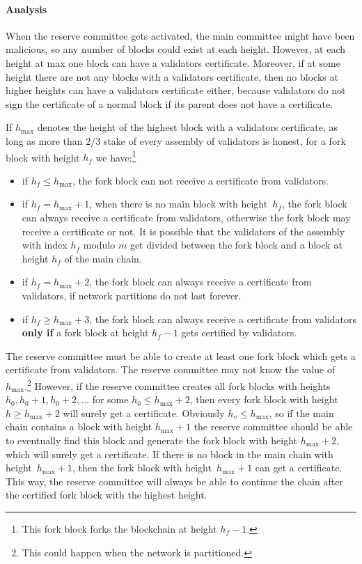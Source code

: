 \paragraph{Analysis}

When the reserve committee gets activated, the main committee might have been malicious, so any number of blocks could
exist at each height. However, at each height at max one block can have a validators certificate. Moreover, if at some
height there are not any blocks with a validators certificate, then no blocks at higher heights can have a
validators certificate either, because validators do not sign the certificate of a normal block if its parent does
not have a certificate.

If $h_{\max}$ denotes the height of the highest block with a validators certificate, as long as more than $2/3$ stake
of every assembly of validators is honest, for a fork block with height $h_f$ we have:\footnote{This fork block
forks the blockchain at height $h_f-1$.}
\begin{itemize}
    \item if $h_f \leq h_{\max}$, the fork block can not receive a certificate from validators.
    \item if $h_f = h_{\max} + 1$, when there is no main block with height~$h_f$, the fork block can always receive a
    certificate from validators, otherwise the fork block may receive a certificate or not. It is possible that
    the validators of the assembly with index $h_f$ modulo $m$ get divided between the fork block and a block at
    height $h_f$ of the main chain.
    \item if $h_f = h_{\max} + 2$, the fork block can always receive a certificate from validators, if network
    partitions do not last forever.
    \item if $h_f \geq h_{\max} + 3$, the fork block can always receive a certificate from validators \textbf{only if} a
    fork block at height $h_f-1$ gets certified by validators.
\end{itemize}

The reserve committee must be able to create at least one fork block which gets a certificate from validators.
The reserve committee may not know the value of $h_{\max}$.\footnote{This could happen when the network is
partitioned.} However, if the reserve committee creates all fork blocks
with heights~$h_0,h_0+1,h_0+2,\dots$ for some $h_0 \leq h_{\max} + 2$,
then every fork block with height~$h \geq h_{\max} +
2$ will surely get a certificate. Obviously $h_v \leq h_{\max}$, so if the main chain contains a block with height
$h_{\max} + 1$ the reserve committee should be able to eventually find this block and generate the fork block with
height $h_{\max} + 2$, which will surely get a certificate.
If there is no block in the main chain with height~$h_{\max} + 1$, then the fork block with
height~$h_{\max} + 1$ can get a certificate. This way, the reserve committee will always be able to continue the chain
after the certified fork block with the highest height.

